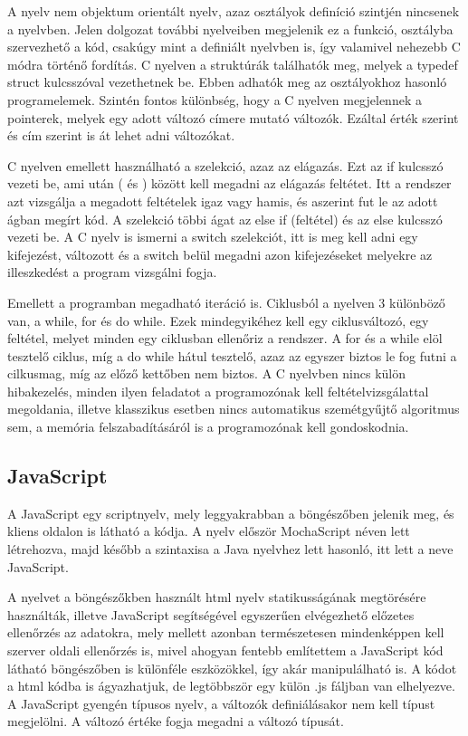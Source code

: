 A nyelv nem objektum orientált nyelv, azaz osztályok definíció szintjén nincsenek a nyelvben. Jelen dolgozat további nyelveiben megjelenik ez a funkció, osztályba szervezhető a kód, csakúgy mint a definiált nyelvben is, így valamivel nehezebb C módra történő fordítás. C nyelven a struktúrák találhatók meg, melyek a typedef struct kulcsszóval vezethetnek be. Ebben adhatók meg az osztályokhoz hasonló programelemek. Szintén fontos különbség, hogy a C nyelven megjelennek a pointerek, melyek egy adott változó címere mutató változók. Ezáltal érték szerint és cím szerint is át lehet adni változókat.

C nyelven emellett használható a szelekció, azaz az elágazás. Ezt az if kulcsszó vezeti be, ami után ( és ) között kell megadni az elágazás feltétet. Itt a rendszer azt vizsgálja a megadott feltételek igaz vagy hamis, és aszerint fut le az adott ágban megírt kód. A szelekció többi ágat az else if (feltétel) és az else kulcsszó vezeti be. A C nyelv is ismerni a switch szelekciót, itt is meg kell adni egy kifejezést, változott és a switch belül megadni azon kifejezéseket melyekre az illeszkedést a program vizsgálni fogja.

Emellett a programban megadható iteráció is. Ciklusból a nyelven 3 különböző van, a while, for és do while. Ezek mindegyikéhez kell egy ciklusváltozó, egy feltétel, melyet minden egy ciklusban ellenőriz a rendszer. A for és a while elöl tesztelő ciklus, míg a do while hátul tesztelő, azaz az egyszer biztos le fog futni a cilkusmag, míg az előző kettőben nem biztos. A C nyelvben nincs külön hibakezelés, minden ilyen feladatot a programozónak kell feltételvizsgálattal megoldania, illetve klasszikus esetben nincs automatikus szemétgyűjtő algoritmus sem, a memória felszabadításáról is a programozónak kell gondoskodnia.

\subsection{JavaScript}

A JavaScript egy scriptnyelv, mely leggyakrabban a böngészőben jelenik meg, és kliens oldalon is látható a kódja. A nyelv először MochaScript néven lett létrehozva, majd később a szintaxisa a Java nyelvhez lett hasonló, itt lett a neve JavaScript.

A nyelvet a böngészőkben használt html nyelv statikusságának megtörésére használták, illetve JavaScript segítségével egyszerűen elvégezhető előzetes ellenőrzés az adatokra, mely mellett azonban természetesen mindenképpen kell szerver oldali ellenőrzés is, mivel ahogyan fentebb említettem a JavaScript kód látható böngészőben is különféle eszközökkel, így akár manipulálható is. A kódot a html kódba is ágyazhatjuk, de legtöbbször egy külön .js fáljban van elhelyezve. A JavaScript gyengén típusos nyelv, a változók definiálásakor nem kell típust megjelölni. A változó értéke fogja megadni a változó típusát.

